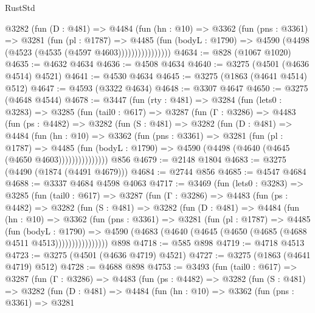 \begin{lexlean}{RustStd}
\begin{coremodule}
                @3282
                  (fun (D : @481) =>
                  @4484
                    (fun (hn : @10) =>
                    @3362
                      (fun (pns : @3361) =>
                      @3281
                        (fun (pl : @1787) =>
                        @4485
                          (fun (bodyL : @1790) =>
                          @4590 (@4498 (@4523 (@4535 (@4597 @4603))))))))))))))))
@4634 := @828 (@1067 @1020)
@4635 := @4632 @4634
@4636 := @4508 @4634
@4640 := @3275 (@4501 (@4636 @4514) @4521)
@4641 := @4530 @4634
@4645 := @3275 (@1863 (@4641 @4514) @512)
@4647 := @4593 (@3322 @4634)
@4648 := @3307 @4647
@4650 := @3275 (@4648 @4544)
@4678 := @3447
    (fun (rty : @481) =>
    @3284
      (fun (lets0 : @3283) =>
      @3285
        (fun (tail0 : @617) =>
        @3287
          (fun (Γ : @3286) =>
          @4483
            (fun (ps : @4482) =>
            @3282
              (fun (S : @481) =>
              @3282
                (fun (D : @481) =>
                @4484
                  (fun (hn : @10) =>
                  @3362
                    (fun (pns : @3361) =>
                    @3281
                      (fun (pl : @1787) =>
                      @4485
                        (fun (bodyL : @1790) =>
                        @4590 (@4498 (@4640 (@4645 (@4650 @4603)))))))))))))))
    @856
@4679 := @2148 @1804
@4683 := @3275 (@4490 (@1874 (@4491 @4679)))
@4684 := @2744 @856
@4685 := @4547 @4684
@4688 := @3337 @4684 @4598 @4063
@4717 := @3469
    (fun (lets0 : @3283) =>
    @3285
      (fun (tail0 : @617) =>
      @3287
        (fun (Γ : @3286) =>
        @4483
          (fun (ps : @4482) =>
          @3282
            (fun (S : @481) =>
            @3282
              (fun (D : @481) =>
              @4484
                (fun (hn : @10) =>
                @3362
                  (fun (pns : @3361) =>
                  @3281
                    (fun (pl : @1787) =>
                    @4485
                      (fun (bodyL : @1790) =>
                      @4590 (@4683 (@4640 (@4645 (@4650 (@4685 (@4688 @4511 @4513))))))))))))))))
    @898
@4718 := @585 @898
@4719 := @4718 @4513
@4723 := @3275 (@4501 (@4636 @4719) @4521)
@4727 := @3275 (@1863 (@4641 @4719) @512)
@4728 := @4688 @898
@4753 := @3493
    (fun (tail0 : @617) =>
    @3287
      (fun (Γ : @3286) =>
      @4483
        (fun (ps : @4482) =>
        @3282
          (fun (S : @481) =>
          @3282
            (fun (D : @481) =>
            @4484
              (fun (hn : @10) =>
              @3362
                (fun (pns : @3361) =>
                @3281

\end{coremodule}
\end{lexlean}
